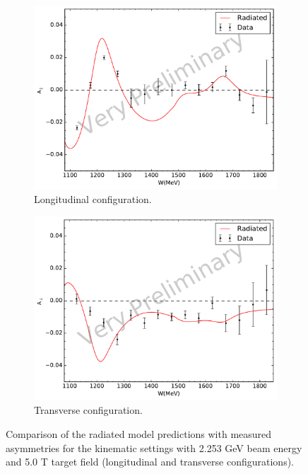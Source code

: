 \begin{figure}[p!]
  \centering
  \begin{subfigure}[t]{0.79\textwidth}
    \includegraphics[width=\textwidth]{figs/asymmetry-data-model-22535000.pdf}
    \caption{Longitudinal configuration. \label{C8S2F3a}}
  \end{subfigure}
  \begin{subfigure}[t]{0.79\textwidth}
    \includegraphics[width=\textwidth]{figs/asymmetry-data-model-22535090.pdf}
    \caption{Transverse configuration. \label{C8S2F3b}}
  \end{subfigure}
  \caption[Asymmetries with $E=2.253$ GeV and $B=5.0$ T.]{Comparison of the radiated model predictions with measured asymmetries for the kinematic settings with 2.253 GeV beam energy and 5.0 T target field (longitudinal and transverse configurations). \label{C8S2F3}}
\end{figure}

